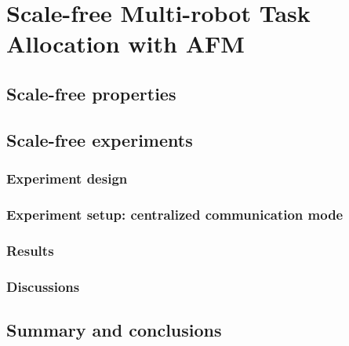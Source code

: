 \chapter{Scale-free Multi-robot Task Allocation with AFM}
\section{Scale-free properties}
\section{Scale-free experiments}
\subsection{Experiment design}
\subsection{Experiment setup: centralized communication mode}
\subsection{Results}
\subsection{Discussions}
\section{Summary and conclusions}